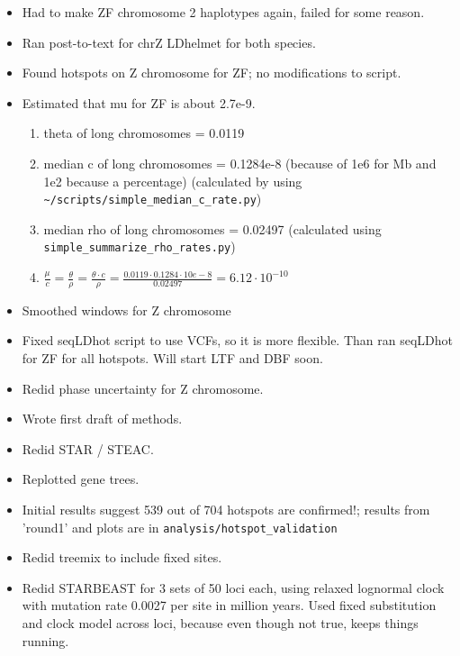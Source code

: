 \documentclass[idxtotoc,hyperref,openany,oneside]{labbook} %
\begin{document}
\begin{itemize}
\item Had to make ZF chromosome 2 haplotypes again, failed for some reason.
\item Ran post-to-text for chrZ LDhelmet for both species.
\item Found hotspots on Z chromosome for ZF; no modifications to script.
\item Estimated that mu for ZF is about 2.7e-9.
\begin{enumerate}
	\item theta of long chromosomes = 0.0119
	\item median c of long chromosomes =  0.1284e-8 (because of 1e6 for Mb and 1e2 because a percentage) (calculated by using \verb+~/scripts/simple_median_c_rate.py+)
	\item median rho of long chromosomes = 0.02497 (calculated using \verb+simple_summarize_rho_rates.py+)
	\item $ \frac{\mu}{c} = \frac{\theta}{\rho} = \frac{\theta \cdot c}{\rho}  = \frac{0.0119 \cdot 0.1284 \cdot 10e-8}{0.02497} = 6.12 \cdot 10^{-10}$
\end{enumerate}
\item Smoothed windows for Z chromosome
\item Fixed seqLDhot script to use VCFs, so it is more flexible. Than ran seqLDhot for ZF for all hotspots. Will start LTF and DBF soon.
\item Redid phase uncertainty for Z chromosome.
\item Wrote first draft of methods.
\item Redid STAR / STEAC.
\item Replotted gene trees.
\item Initial results suggest 539 out of 704 hotspots are confirmed!; results from 'round1' and plots are in \verb+analysis/hotspot_validation+
\item Redid treemix to include fixed sites.
\item Redid STARBEAST for 3 sets of 50 loci each, using relaxed lognormal clock with mutation rate 0.0027 per site in million years. Used fixed substitution and clock model across loci, because even though not true, keeps things running.
\end{itemize}
\end{document}
